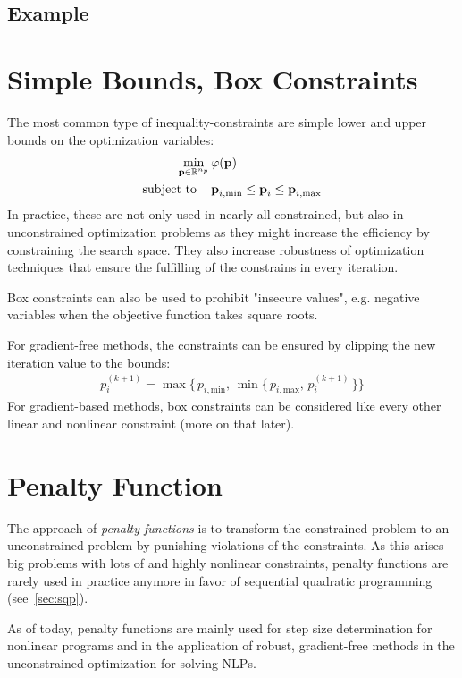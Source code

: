 		\subsection{Example} %

	\section{Simple Bounds, Box Constraints}
		The most common type of inequality-constraints are simple lower and upper bounds on the optimization variables:
		\begin{align*}
			\min_{\boldsymbol{\mathrm{p}} \in \mathbb{R}^{n_p}} &\, \varphi(\boldsymbol{\mathrm{p}}) \\
			\mathrm{subject~to}\quad &\,
				\boldsymbol{\mathrm{p}}_{i, \mathrm{min}} \leq \boldsymbol{\mathrm{p}}_i \leq \boldsymbol{\mathrm{p}}_{i, \mathrm{max}}
		\end{align*}
		In practice, these are not only used in nearly all constrained, but also in unconstrained optimization problems as they might increase the efficiency by constraining the search space. They also increase robustness of optimization techniques that ensure the fulfilling of the constrains in every iteration.
		
		Box constraints can also be used to prohibit "insecure values", e.g. negative variables when the objective function takes square roots.
		
		For gradient-free methods, the constraints can be ensured by clipping the new iteration value to the bounds:
		\begin{align*}
			p_i^{(k + 1)} = \max\big\{\, p_{i, \mathrm{min}},\, \min\big\{\, p_{i, \mathrm{max}},\, p_i^{(k + 1)} \,\big\} \big\}
		\end{align*}
		For gradient-based methods, box constraints can be considered like every other linear and nonlinear constraint (more on that later).

	\section{Penalty Function}
		The approach of \emph{penalty functions} is to transform the constrained problem to an unconstrained problem by punishing violations of the constraints. As this arises big problems with lots of and highly nonlinear constraints, penalty functions are rarely used in practice anymore in favor of sequential quadratic programming (see~\autoref{sec:sqp}).
		
		As of today, penalty functions are mainly used for step size determination for nonlinear programs and in the application of robust, gradient-free methods in the unconstrained optimization for solving NLPs.


